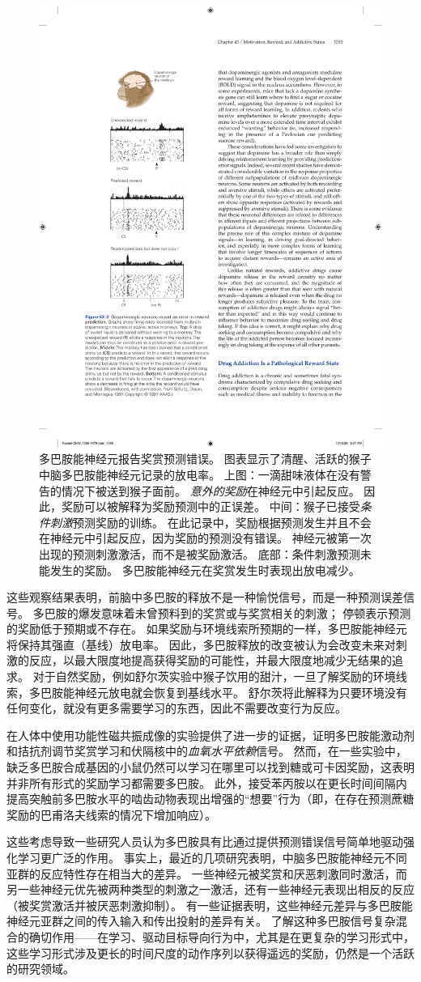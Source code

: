 \begin{figure}[htbp]
	\centering
	\includegraphics[width=0.45\linewidth]{chap43/fig_43_2}
	\caption{多巴胺能神经元报告奖赏预测错误。
		图表显示了清醒、活跃的猴子中脑多巴胺能神经元记录的放电率。
		上图：一滴甜味液体在没有警告的情况下被送到猴子面前。
		\textit{意外的奖励}在神经元中引起反应。
		因此，奖励可以被解释为奖励预测中的正误差。
		中间：猴子已接受\textit{条件刺激}预测奖励的训练。
		在此记录中，奖励根据预测发生并且不会在神经元中引起反应，因为奖励的预测没有错误。
		神经元被第一次出现的预测刺激激活，而不是被奖励激活。
		底部：条件刺激预测未能发生的奖励。
		多巴胺能神经元在奖赏发生时表现出放电减少\cite{schultz1997neural}。}
	\label{fig:43_2}
\end{figure}


这些观察结果表明，前脑中多巴胺的释放不是一种愉悦信号，而是一种预测误差信号。
多巴胺的爆发意味着未曾预料到的奖赏或与奖赏相关的刺激；
停顿表示预测的奖励低于预期或不存在。
如果奖励与环境线索所预期的一样，多巴胺能神经元将保持其强直（基线）放电率。
因此，多巴胺释放的改变被认为会改变未来对刺激的反应，以最大限度地提高获得奖励的可能性，并最大限度地减少无结果的追求。
对于自然奖励，例如舒尔茨实验中猴子饮用的甜汁，一旦了解奖励的环境线索，多巴胺能神经元放电就会恢复到基线水平。
舒尔茨将此解释为只要环境没有任何变化，就没有更多需要学习的东西，因此不需要改变行为反应。


在人体中使用功能性磁共振成像的实验提供了进一步的证据，证明多巴胺能激动剂和拮抗剂调节奖赏学习和伏隔核中的\textit{血氧水平依赖}信号。
然而，在一些实验中，缺乏多巴胺合成基因的小鼠仍然可以学习在哪里可以找到糖或可卡因奖励，这表明并非所有形式的奖励学习都需要多巴胺。
此外，接受苯丙胺以在更长时间间隔内提高突触前多巴胺水平的啮齿动物表现出增强的“想要”行为（即，在存在预测蔗糖奖励的巴甫洛夫线索的情况下增加响应）。


这些考虑导致一些研究人员认为多巴胺具有比通过提供预测错误信号简单地驱动强化学习更广泛的作用。
事实上，最近的几项研究表明，中脑多巴胺能神经元不同亚群的反应特性存在相当大的差异。
一些神经元被奖赏和厌恶刺激同时激活，而另一些神经元优先被两种类型的刺激之一激活，还有一些神经元表现出相反的反应（被奖赏激活并被厌恶刺激抑制）。
有一些证据表明，这些神经元差异与多巴胺能神经元亚群之间的传入输入和传出投射的差异有关。
了解这种多巴胺信号复杂混合的确切作用——在学习、驱动目标导向行为中，尤其是在更复杂的学习形式中，这些学习形式涉及更长的时间尺度的动作序列以获得遥远的奖励，仍然是一个活跃的研究领域。


